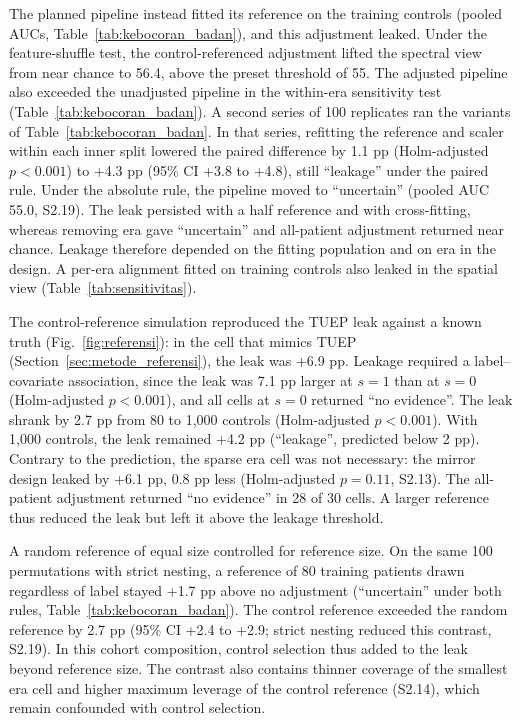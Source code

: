 \documentclass[final,1p,times]{elsarticle}
\newcommand{\figref}[1]{Fig.~\ref{#1}}
\newcommand{\tabref}[1]{Table~\ref{#1}}
\begin{document}
The planned pipeline instead fitted its reference on the training controls (pooled AUCs, \tabref{tab:kebocoran_badan}), and this adjustment leaked. Under the feature-shuffle test, the control-referenced adjustment lifted the spectral view from near chance to 56.4, above the preset threshold of 55. The adjusted pipeline also exceeded the unadjusted pipeline in the within-era sensitivity test (\tabref{tab:kebocoran_badan}). A second series of 100 replicates ran the variants of \tabref{tab:kebocoran_badan}. In that series, refitting the reference and scaler within each inner split lowered the paired difference by 1.1 pp (Holm-adjusted $p<0.001$) to +4.3 pp (95\% CI +3.8 to +4.8), still ``leakage'' under the paired rule. Under the absolute rule, the pipeline moved to ``uncertain'' (pooled AUC 55.0, S2.19). The leak persisted with a half reference and with cross-fitting, whereas removing era gave ``uncertain'' and all-patient adjustment returned near chance. Leakage therefore depended on the fitting population and on era in the design. A per-era alignment fitted on training controls also leaked in the spatial view (Table~\ref{tab:sensitivitas}).

The control-reference simulation reproduced the TUEP leak against a known truth (\figref{fig:referensi}): in the cell that mimics TUEP (Section~\ref{sec:metode_referensi}), the leak was +6.9 pp. Leakage required a label--covariate association, since the leak was 7.1 pp larger at $s=1$ than at $s=0$ (Holm-adjusted $p<0.001$), and all cells at $s=0$ returned ``no evidence''. The leak shrank by 2.7 pp from 80 to 1,000 controls (Holm-adjusted $p<0.001$). With 1,000 controls, the leak remained +4.2 pp (``leakage'', predicted below 2 pp). Contrary to the prediction, the sparse era cell was not necessary: the mirror design leaked by +6.1 pp, 0.8 pp less (Holm-adjusted $p = 0.11$, S2.13). The all-patient adjustment returned ``no evidence'' in 28 of 30 cells. A larger reference thus reduced the leak but left it above the leakage threshold.

A random reference of equal size controlled for reference size. On the same 100 permutations with strict nesting, a reference of 80 training patients drawn regardless of label stayed +1.7 pp above no adjustment (``uncertain'' under both rules, \tabref{tab:kebocoran_badan}). The control reference exceeded the random reference by 2.7 pp (95\% CI +2.4 to +2.9; strict nesting reduced this contrast, S2.19). In this cohort composition, control selection thus added to the leak beyond reference size. The contrast also contains thinner coverage of the smallest era cell and higher maximum leverage of the control reference (S2.14), which remain confounded with control selection.
\end{document}
